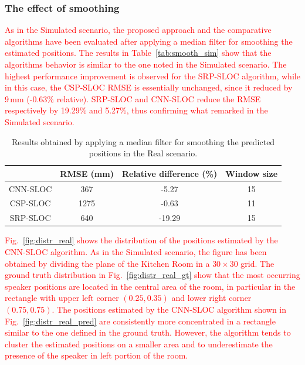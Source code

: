 \documentclass[review]{elsarticle}
\newcommand{\figref}[1]{Fig.~\ref{#1}}
\newcommand{\tableref}[1]{Table~\ref{#1}}
\begin{document}
\subsubsection{The effect of smoothing}
\textcolor{red}{
As in the Simulated scenario, the proposed approach and the comparative algorithms have been evaluated after applying a median filter for smoothing the estimated positions. The results in \tableref{tab:smooth_sim} show that the algorithms behavior is similar to the one noted in the Simulated scenario. The highest performance improvement is observed for the SRP-SLOC algorithm, while in this case, the CSP-SLOC RMSE is essentially unchanged, since it reduced by 9\,mm (-0.63\% relative). SRP-SLOC and CNN-SLOC reduce the RMSE respectively by 19.29\% and 5.27\%, thus confirming what remarked in the Simulated scenario.
}

\begin{table}[t]
\centering
\caption{Results obtained by applying a median filter for smoothing the predicted positions in the Real scenario.}\label{tab:smooth_real}
\begin{tabular}{c | c | c | c}
  	 				& RMSE (mm) & Relative difference (\%) & Window size \\
\hline
CNN-SLOC    & 367 & -5.27 & 15 \\
CSP-SLOC    & 1275 & -0.63 & 11\\
SRP-SLOC    & 640 & -19.29 & 15\\
\end{tabular}
\end{table}

\textcolor{red}{
\figref{fig:distr_real} shows the distribution of the positions estimated by the CNN-SLOC algorithm. As in the Simulated scenario, the figure has been obtained by dividing the plane of the Kitchen Room in a $30 \times 30$ grid. The ground truth distribution in \figref{fig:distr_real_gt} show that the most occurring speaker positions are located in the central area of the room, in particular in the rectangle with upper left corner $(0.25, 0.35)$ and lower right corner $(0.75, 0.75)$. The positions estimated by the CNN-SLOC algorithm shown in \figref{fig:distr_real_pred} are consistently more concentrated in a rectangle similar to the one defined in the ground truth. However, the algorithm tends to cluster the estimated positions on a smaller area and to underestimate the presence of the speaker in left portion of the room.
}
\end{document}
